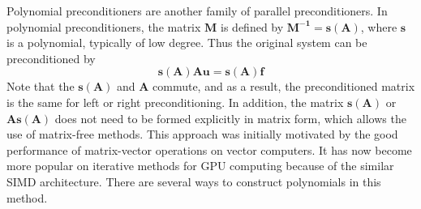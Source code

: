Polynomial preconditioners are another family of parallel preconditioners. In polynomial preconditioners, the matrix $\boldsymbol{M}$ is defined by $\boldsymbol{M^{-1} = s(A)}$, where $\boldsymbol{s}$ is a polynomial, typically of low degree. Thus the original system can be preconditioned by 
\begin{equation}
    \boldsymbol{s(A)Au = s(A)f}
\end{equation}
Note that the $\boldsymbol{s(A)}$ and $\boldsymbol{A}$ commute, and as a result, the preconditioned matrix is the same for left or right preconditioning. In addition, the matrix $\boldsymbol{s(A)}$ or $\boldsymbol{As(A)}$ does not need to be formed explicitly in matrix form, which allows the use of matrix-free methods.
This approach was initially motivated by the good performance of matrix-vector operations on vector computers. It has now become more popular on iterative methods for GPU computing because of the similar SIMD architecture. 
There are several ways to construct polynomials in this method.

